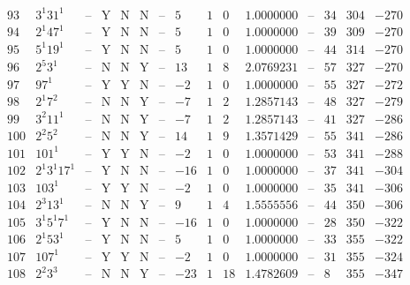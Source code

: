 \documentclass[11pt,reqno,a4letter]{article}
\numberwithin{figure}{section}
\numberwithin{table}{section}
\theoremstyle{plain}
\numberwithin{theorem}{section}
\theoremstyle{definition}
\begin{document}
\begin{table}[h!]
\begin{equation*}
{\begin{array}{|cc|c|ccc|c|c|ccc|c|ccc}
 93 & 3^1 31^1 & \text{--} & \text{Y} & \text{N} & \text{N} & \text{--} & 5 & 1 & 0 & 1.0000000 & \text{--} & 34 & 304 & -270 \\
 94 & 2^1 47^1 & \text{--} & \text{Y} & \text{N} & \text{N} & \text{--} & 5 & 1 & 0 & 1.0000000 & \text{--} & 39 & 309 & -270 \\
 95 & 5^1 19^1 & \text{--} & \text{Y} & \text{N} & \text{N} & \text{--} & 5 & 1 & 0 & 1.0000000 & \text{--} & 44 & 314 & -270 \\
 96 & 2^5 3^1 & \text{--} & \text{N} & \text{N} & \text{Y} & \text{--} & 13 & 1 & 8 & 2.0769231 & \text{--} & 57 & 327 & -270 \\
 97 & 97^1 & \text{--} & \text{Y} & \text{Y} & \text{N} & \text{--} & -2 & 1 & 0 & 1.0000000 & \text{--} & 55 & 327 & -272 \\
 98 & 2^1 7^2 & \text{--} & \text{N} & \text{N} & \text{Y} & \text{--} & -7 & 1 & 2 & 1.2857143 & \text{--} & 48 & 327 & -279 \\
 99 & 3^2 11^1 & \text{--} & \text{N} & \text{N} & \text{Y} & \text{--} & -7 & 1 & 2 & 1.2857143 & \text{--} & 41 & 327 & -286 \\
 100 & 2^2 5^2 & \text{--} & \text{N} & \text{N} & \text{Y} & \text{--} & 14 & 1 & 9 & 1.3571429 & \text{--} & 55 & 341 & -286 \\
 101 & 101^1 & \text{--} & \text{Y} & \text{Y} & \text{N} & \text{--} & -2 & 1 & 0 & 1.0000000 & \text{--} & 53 & 341 & -288 \\
 102 & 2^1 3^1 17^1 & \text{--} & \text{Y} & \text{N} & \text{N} & \text{--} & -16 & 1 & 0 & 1.0000000 & \text{--} & 37 & 341 & -304 \\
 103 & 103^1 & \text{--} & \text{Y} & \text{Y} & \text{N} & \text{--} & -2 & 1 & 0 & 1.0000000 & \text{--} & 35 & 341 & -306 \\
 104 & 2^3 13^1 & \text{--} & \text{N} & \text{N} & \text{Y} & \text{--} & 9 & 1 & 4 & 1.5555556 & \text{--} & 44 & 350 & -306 \\
 105 & 3^1 5^1 7^1 & \text{--} & \text{Y} & \text{N} & \text{N} & \text{--} & -16 & 1 & 0 & 1.0000000 & \text{--} & 28 & 350 & -322 \\
 106 & 2^1 53^1 & \text{--} & \text{Y} & \text{N} & \text{N} & \text{--} & 5 & 1 & 0 & 1.0000000 & \text{--} & 33 & 355 & -322 \\
 107 & 107^1 & \text{--} & \text{Y} & \text{Y} & \text{N} & \text{--} & -2 & 1 & 0 & 1.0000000 & \text{--} & 31 & 355 & -324 \\
 108 & 2^2 3^3 & \text{--} & \text{N} & \text{N} & \text{Y} & \text{--} & -23 & 1 & 18 & 1.4782609 & \text{--} & 8 & 355 & -347 \\

\end{array}}
\end{equation*}
\end{table}
\end{document}

